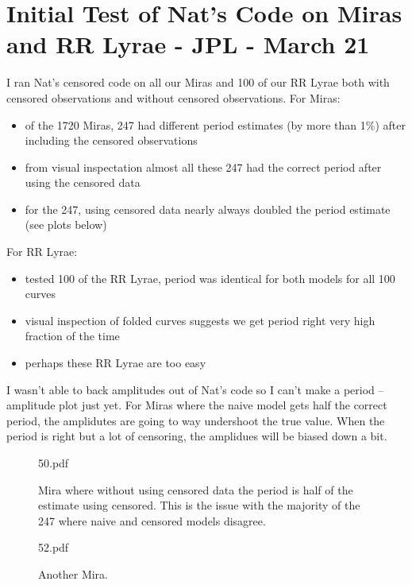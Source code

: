 \documentclass[10pt]{article}
\title{}
\date{}
\author{}
\begin{document}
\section*{Initial Test of Nat's Code on Miras and RR Lyrae - JPL - March 21}

I ran Nat's censored code on all our Miras and 100 of our RR Lyrae both with censored observations and without censored observations. For Miras:

\begin{itemize}
\item of the 1720 Miras, 247 had different period estimates (by more than 1\%) after including the censored observations
\item from visual inspectation almost all these 247 had the correct period after using the censored data
\item for the 247, using censored data nearly always doubled the period estimate (see plots below)
\end{itemize}

\noindent For RR Lyrae:
\begin{itemize}
\item tested 100 of the RR Lyrae, period was identical for both models for all 100 curves
\item visual inspection of folded curves suggests we get period right very high fraction of the time
\item perhaps these RR Lyrae are too easy
\end{itemize}


\noindent I wasn't able to back amplitudes out of Nat's code so I can't make a period -- amplitude plot just yet. For Miras where the naive model gets half the correct period, the amplidutes are going to way undershoot the true value. When the period is right but a lot of censoring, the amplidues will be biased down a bit.


\begin{figure}[h]
  \begin{center}
    \begin{includegraphics}[height=4in,width=4in]{50.pdf}
      \caption{Mira where without using censored data the period is half of the estimate using censored. This is the issue with the majority of the 247 where naive and censored models disagree.}
    \end{includegraphics}
  \end{center}
\end{figure}


\begin{figure}[h]
  \begin{center}
    \begin{includegraphics}[height=4in,width=4in]{52.pdf}
      \caption{Another Mira.}
    \end{includegraphics}
  \end{center}
\end{figure}
\end{document}
